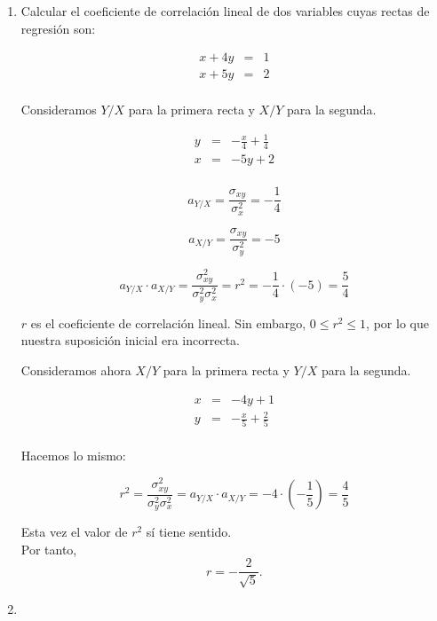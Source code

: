 \documentclass[10pt,a4paper]{article}
\begin{document}
\begin{enumerate}
\item Calcular el coeficiente de correlación lineal de dos variables cuyas rectas de regresión son:

\[
\begin{array}{lll}
x + 4y & = & 1\\
x + 5y & = & 2\\
\end{array}
\]

Consideramos $Y/X$ para la primera recta y $X/Y$ para la segunda.

\[
\begin{array}{lll}
y & = & -\frac{x}{4} + \frac{1}{4}\\
x & = & -5y + 2\\
\end{array}
\]

$$a_{Y/X} = \frac{\sigma_{xy}}{\sigma^2_x} = -\frac{1}{4}$$

$$a_{X/Y} = \frac{\sigma_{xy}}{\sigma^2_y} = -5$$

$$a_{Y/X} \cdot a_{X/Y} = \frac{\sigma^2_{xy}}{\sigma^2_y \sigma^2_x} = r^2 = -\frac{1}{4} \cdot (-5) = \frac{5}{4}$$

$r$ es el coeficiente de correlación lineal. Sin embargo, $0 \leq r^2 \leq 1$, por lo que nuestra suposición inicial era incorrecta.

Consideramos ahora $X/Y$ para la primera recta y $Y/X$ para la segunda.

\[
\begin{array}{lll}
x & = & -4y + 1\\
y & = & -\frac{x}{5} + \frac{2}{5}\\
\end{array}
\]

Hacemos lo mismo:

$$r^2 = \frac{\sigma^2_{xy}}{\sigma^2_y \sigma^2_x} = a_{Y/X} \cdot a_{X/Y} = -4 \cdot \left( -\frac{1}{5}  \right) = \frac{4}{5}$$

Esta vez el valor de $r^2$ sí tiene sentido.
\\Por tanto, $$r = -\frac{2}{\sqrt{5}}.$$
\newpage

\item
\newpage



\end{enumerate}
\end{document}
